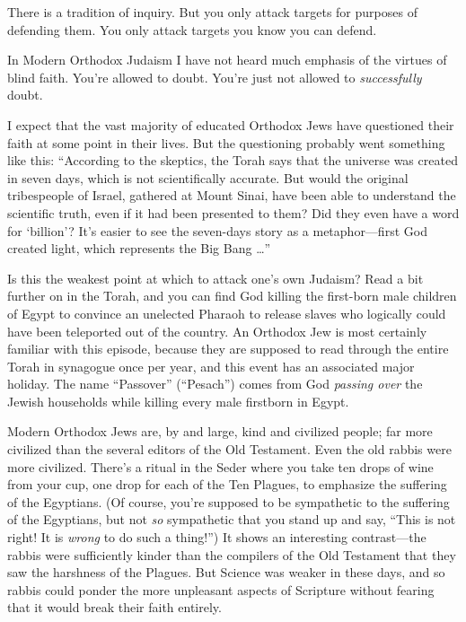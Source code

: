 {
 There is a tradition of inquiry. But you only attack targets for
purposes of defending them. You only attack targets you know you can
defend.}

{
 In Modern Orthodox Judaism I have not heard much emphasis of the
virtues of blind faith. You're allowed to doubt.
You're just not allowed to \textit{successfully}
doubt.}

{
 I expect that the vast majority of educated Orthodox Jews have
questioned their faith at some point in their lives. But the
questioning probably went something like this:
``According to the skeptics, the Torah says that the
universe was created in seven days, which is not scientifically
accurate. But would the original tribespeople of Israel, gathered at
Mount Sinai, have been able to understand the scientific truth, even if
it had been presented to them? Did they even have a word for
`billion'? It's easier
to see the seven-days story as a metaphor---first God created light,
which represents the Big Bang \ldots''}

{
 Is this the weakest point at which to attack one's
own Judaism? Read a bit further on in the Torah, and you can find God
killing the first-born male children of Egypt to convince an unelected
Pharaoh to release slaves who logically could have been teleported out
of the country. An Orthodox Jew is most certainly familiar with this
episode, because they are supposed to read through the entire Torah in
synagogue once per year, and this event has an associated major
holiday. The name ``Passover''
(``Pesach'') comes from God
\textit{passing over} the Jewish households while killing every male
firstborn in Egypt.}

{
 Modern Orthodox Jews are, by and large, kind and civilized people;
far more civilized than the several editors of the Old Testament. Even
the old rabbis were more civilized. There's a ritual in
the Seder where you take ten drops of wine from your cup, one drop for
each of the Ten Plagues, to emphasize the suffering of the Egyptians.
(Of course, you're supposed to be sympathetic to the
suffering of the Egyptians, but not \textit{so} sympathetic that you
stand up and say, ``This is not right! It is
\textit{wrong} to do such a thing!'') It shows an
interesting contrast---the rabbis were sufficiently kinder than the
compilers of the Old Testament that they saw the harshness of the
Plagues. But Science was weaker in these days, and so rabbis could
ponder the more unpleasant aspects of Scripture without fearing that it
would break their faith entirely.}

